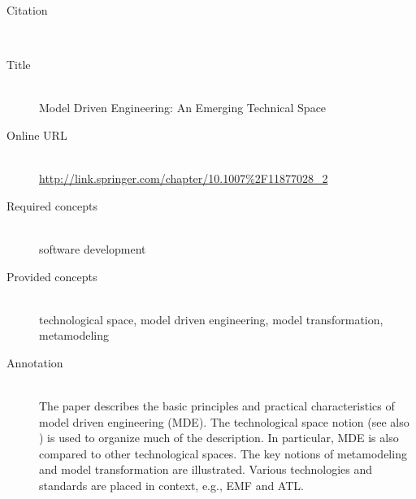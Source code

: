 \begin{description}
\item[Citation]\mbox{}\\
\cite{Bezivin06}
\item[Title]\mbox{}\\
Model Driven Engineering: An Emerging Technical Space
\item[Online URL]\mbox{}\\
{\footnotesize\url{http://link.springer.com/chapter/10.1007%2F11877028_2}}
\item[Required concepts]\mbox{}\\
software development\item[Provided concepts]\mbox{}\\
technological space, model driven engineering, model transformation, metamodeling\item[Annotation]\mbox{}\\
The paper describes the basic principles and practical characteristics of model driven engineering (MDE). The technological space notion (see also \cite{KurtevBA02}) is used to organize much of the description. In particular, MDE is also compared to other technological spaces. The key notions of metamodeling and model transformation are illustrated. Various technologies and standards are placed in context, e.g., EMF and ATL.
\end{description}

